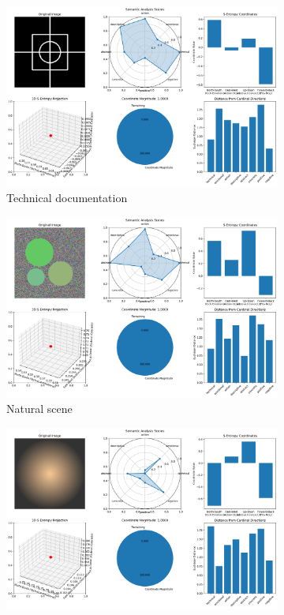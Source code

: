 \begin{figure}[htbp]
\centering
\begin{subfigure}{0.32\textwidth}
\includegraphics[width=\textwidth]{helicopter/demos/s_entropy_demo_technical_image.png}
\caption{Technical documentation}
\end{subfigure}
\hfill
\begin{subfigure}{0.32\textwidth}
\includegraphics[width=\textwidth]{helicopter/demos/s_entropy_demo_natural_image.png}
\caption{Natural scene}
\end{subfigure}
\hfill
\begin{subfigure}{0.32\textwidth}
\includegraphics[width=\textwidth]{helicopter/demos/s_entropy_demo_emotional_image.png}

\end{subfigure}
\end{figure}
